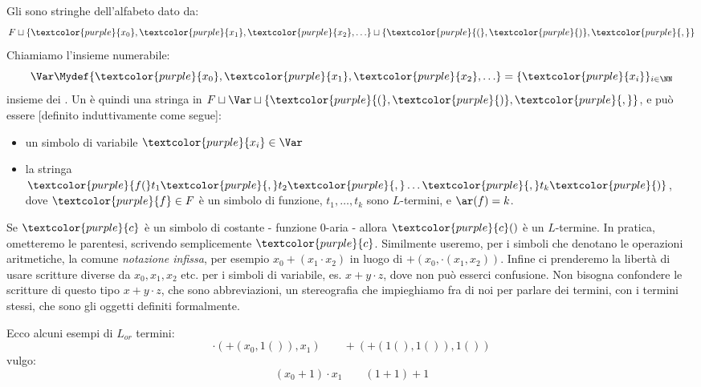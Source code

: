 \begin{definition}
    [$L$-termine]
    Gli  sono stringhe dell'alfabeto dato da:
    \[ F \sqcup \{\textcolor{purple}{x_0},\textcolor{purple}{x_1},\textcolor{purple}{x_2}, \ldots\} \sqcup \{\textcolor{purple}{(}, \textcolor{purple}{)}, \textcolor{purple}{,}\}
    \]
    Chiamiamo l'insieme numerabile:
    \[ \Var \Mydef \{\textcolor{purple}{x_0},\textcolor{purple}{x_1},\textcolor{purple}{x_2}, \ldots\} = \{\textcolor{purple}{x_i}\}_{i \in \NN}
    \]
    insieme dei . Un  è quindi una stringa in $F \sqcup \Var \sqcup \{\textcolor{purple}{(}, \textcolor{purple}{)}, \textcolor{purple}{,}\}$, e può essere [definito induttivamente come segue]:
    \begin{itemize}
        \item un simbolo di variabile $\textcolor{purple}{x_i} \in \Var$
        \item la stringa $\textcolor{purple}{f(}t_1\textcolor{purple}{,}t_2\textcolor{purple}{,} \ldots\textcolor{purple}{,} t_k\textcolor{purple}{)}$, dove $\textcolor{purple}{f} \in F$ è un simbolo di funzione, $t_1,\ldots,t_k$ sono $L$-termini, e $\ar(f) = k$.
    \end{itemize}
\end{definition}

\begin{remark}
    Se $\textcolor{purple}{c}$ è un simbolo di costante - funzione 0-aria - allora $\textcolor{purple}{c}()$ è un $L$-termine. In pratica, ometteremo le parentesi, scrivendo semplicemente $\textcolor{purple}{c}$.
    Similmente useremo, per i simboli che denotano le operazioni aritmetiche, la comune \emph{notazione infissa}, per esempio $x_0 + (x_1 \cdot x_2)$ in luogo di $+(x_0, \cdot(x_1,x_2))$.
    Infine ci prenderemo la libertà di usare scritture diverse da $x_0,x_1,x_2$ etc. per i simboli di variabile, es. $x+y\cdot z$, dove non può esserci confusione.
    Non bisogna confondere le scritture di questo tipo $x+y\cdot z$, che sono abbreviazioni, un stereografia che impieghiamo fra di noi per parlare dei termini, con i termini stessi, che sono gli oggetti definiti formalmente.
\end{remark}

\begin{example}
    Ecco alcuni esempi di $L_{or}$ termini:
    \[ \cdot(+(x_0,1()),x_1) \qquad +(+(1(),1()),1())
    \]
    vulgo:
    \[ (x_0 + 1) \cdot x_1 \qquad (1 + 1) + 1
    \]
\end{example}

